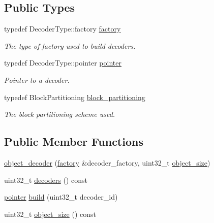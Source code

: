 \subsection*{Public Types}
\begin{DoxyCompactItemize}
\item 
\hypertarget{classkodo_1_1object__decoder_acd1470f04f34ae297bcc5a6e625f38a2}{typedef Decoder\-Type\-::factory \hyperlink{classkodo_1_1object__decoder_acd1470f04f34ae297bcc5a6e625f38a2}{factory}}\label{classkodo_1_1object__decoder_acd1470f04f34ae297bcc5a6e625f38a2}

\begin{DoxyCompactList}\small\item\em The type of factory used to build decoders. \end{DoxyCompactList}\item 
\hypertarget{classkodo_1_1object__decoder_a2d53e4d4369d535ca146ac5c912d9310}{typedef Decoder\-Type\-::pointer \hyperlink{classkodo_1_1object__decoder_a2d53e4d4369d535ca146ac5c912d9310}{pointer}}\label{classkodo_1_1object__decoder_a2d53e4d4369d535ca146ac5c912d9310}

\begin{DoxyCompactList}\small\item\em Pointer to a decoder. \end{DoxyCompactList}\item 
\hypertarget{classkodo_1_1object__decoder_a4c945b71219089d00d652f146a3dd1fa}{typedef Block\-Partitioning \hyperlink{classkodo_1_1object__decoder_a4c945b71219089d00d652f146a3dd1fa}{block\-\_\-partitioning}}\label{classkodo_1_1object__decoder_a4c945b71219089d00d652f146a3dd1fa}

\begin{DoxyCompactList}\small\item\em The block partitioning scheme used. \end{DoxyCompactList}\end{DoxyCompactItemize}
\subsection*{Public Member Functions}
\begin{DoxyCompactItemize}
\item 
\hyperlink{classkodo_1_1object__decoder_a66b91c6fccc5e7cad7ebfecc5ff10839}{object\-\_\-decoder} (\hyperlink{classkodo_1_1object__decoder_acd1470f04f34ae297bcc5a6e625f38a2}{factory} \&decoder\-\_\-factory, uint32\-\_\-t \hyperlink{classkodo_1_1object__decoder_ae4759b34a39ae09018af600dbc6095e7}{object\-\_\-size})
\item 
uint32\-\_\-t \hyperlink{classkodo_1_1object__decoder_a672065905507020b863096d1b458037d}{decoders} () const 
\item 
\hyperlink{classkodo_1_1object__decoder_a2d53e4d4369d535ca146ac5c912d9310}{pointer} \hyperlink{classkodo_1_1object__decoder_a6405eba3cec6ec50b00ebcb4599ff63c}{build} (uint32\-\_\-t decoder\-\_\-id)
\item 
uint32\-\_\-t \hyperlink{classkodo_1_1object__decoder_ae4759b34a39ae09018af600dbc6095e7}{object\-\_\-size} () const 
\end{DoxyCompactItemize}
